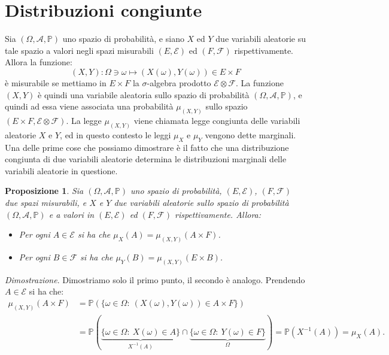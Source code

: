 \documentclass[11pt]{book}
\makeatletter
\theoremstyle{Definizione}
\theoremstyle{TeoremaProposizioneLemmaCorollario}
\newtheorem{mypropo}[myteo]{Proposizione}
\theoremstyle{OsservazioneNota}
\renewenvironment{proof}[1][\proofname]{\par
  \normalfont \topsep6\p@\@plus6\p@\relax
  \trivlist
  \item[\hskip\labelsep
        \itshape
    #1\@addpunct{.}]\ignorespaces
}{%
  \endtrivlist\@endpefalse
}
\renewcommand{\P}{\mathbb{P}}
\renewenvironment{proof}{\textsl{Dimostrazione}.}{}
\makeatother
\begin{document}
\section{Distribuzioni congiunte}
Sia $(\Omega,\mathcal{A},\P)$ uno spazio di probabilità, e siano $X$ ed $Y$ due variabili aleatorie su tale spazio a valori negli spazi misurabili $(E,\mathcal{E})$ ed $(F,\mathcal{F})$ rispettivamente. Allora la funzione:
$$
(X,Y): \Omega\ni \omega \longmapsto (X(\omega),Y(\omega))\in E\times F
$$
è misurabile se mettiamo in $E\times F$ la $\sigma$-algebra prodotto $\mathcal{E}\otimes\mathcal{F}$. La funzione $(X,Y)$ è quindi una variabile aleatoria sullo spazio di probabilità $(\Omega,\mathcal{A},\P)$, e quindi ad essa viene associata una probabilità $\mu_{(X,Y)}$ sullo spazio $(E\times F,\mathcal{E}\otimes \mathcal{F})$. La legge $\mu_{(X,Y)}$ viene chiamata legge congiunta delle variabili aleatorie $X$ e $Y$, ed in questo contesto le leggi $\mu_X$ e $\mu_Y$ vengono dette marginali.\\
Una delle prime cose che possiamo dimostrare è il fatto che una distribuzione congiunta di due variabili aleatorie determina le distribuzioni marginali delle variabili aleatorie in questione.
\begin{boxpro}
\begin{mypropo}\label{pro:DistribuzioneCongiuntaDeterminaDistribuzioniMarginali}
Sia $(\Omega,\mathcal{A},\P)$ uno spazio di probabilità, $(E,\mathcal{E})$, $(F,\mathcal{F})$ due spazi misurabili, e $X$ e $Y$ due variabili aleatorie sullo spazio di probabilità $(\Omega,\mathcal{A},\P)$ e a valori in $(E,\mathcal{E})$ ed $(F,\mathcal{F})$ rispettivamente. Allora:
\begin{itemize}
\item Per ogni $A\in \mathcal{E}$ si ha che $\mu_X(A) = \mu_{(X,Y)}(A\times F)$.
\item Per ogni $B\in \mathcal{F}$ si ha che $\mu_Y(B) = \mu_{(X,Y)}(E\times B)$.
\end{itemize}
\end{mypropo}
\tcblower
\begin{proof}
Dimostriamo solo il primo punto, il secondo è analogo. Prendendo $A\in \mathcal{E}$ si ha che:
\begin{align*}
\mu_{(X,Y)}(A\times F) &= \P(\{\omega\in \Omega:\ (X(\omega),Y(\omega))\in A\times F\})\\
&= \P(\underbrace{\{\omega\in \Omega:\ X(\omega)\in A\}}_{X^{-1}(A)}\cap \underbrace{\{\omega\in \Omega:\ Y(\omega)\in F\}}_{\Omega})= \P(X^{-1}(A)) = \mu_X(A). 
\end{align*}
\end{proof}
\end{boxpro}
\end{document}
